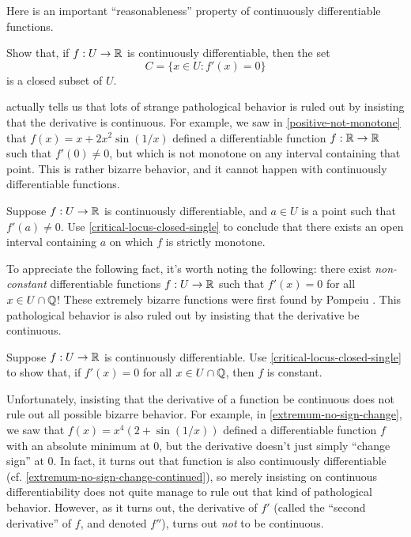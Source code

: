 Here is an important ``reasonableness'' property of continuously differentiable functions. 

\begin{exercise} \label{critical-locus-closed-single}
	Show that, if $f : U \to \mathbb{R}$ is continuously differentiable, then the set
	\[ C = \{ x \in U : f'(x) = 0 \} \]
	is a closed subset of $U$. 
\end{exercise}

 actually tells us that lots of strange pathological behavior is ruled out by insisting that the derivative is continuous. For example, we saw in \cref{positive-not-monotone} that $f(x) = x + 2x^2\sin(1/x)$ defined a differentiable function $f : \mathbb{R} \to \mathbb{R}$ such that $f'(0) \neq 0$, but which is not monotone on any interval containing that point. This is rather bizarre behavior, and it cannot happen with continuously differentiable functions. 

\begin{exercise} \label{nonzero-derivative-at-point-implies-monotone-in-neighborhood}
	Suppose $f : U \to \mathbb{R}$ is continuously differentiable, and $a \in U$ is a point such that $f'(a) \neq 0$. Use \cref{critical-locus-closed-single} to conclude that there exists an open interval containing $a$ on which $f$ is strictly monotone. 
\end{exercise}

To appreciate the following fact, it's worth noting the following: there exist \emph{non-constant} differentiable functions $f : U \to \mathbb{R}$ such that $f'(x) = 0$ for all $x \in U \cap \mathbb{Q}$! These extremely bizarre functions were first found by Pompeiu \cite{pompeiu}. This pathological behavior is also ruled out by insisting that the derivative be continuous. 

\begin{exercise} \label{critical-dense-implies-constant}
	Suppose $f : U \to \mathbb{R}$ is continuously differentiable. Use \cref{critical-locus-closed-single} to show that, if $f'(x) = 0$ for all $x \in U \cap \mathbb{Q}$, then $f$ is constant. 
\end{exercise}

Unfortunately, insisting that the derivative of a function be continuous does not rule out all possible bizarre behavior. For example, in \cref{extremum-no-sign-change}, we saw that $f(x) = x^4 \left( 2 + \sin(1/x) \right)$ defined a differentiable function $f$ with an absolute minimum at 0, but the derivative doesn't just simply ``change sign'' at 0. In fact, it turns out that function is also continuously differentiable (cf. \cref{extremum-no-sign-change-continued}), so merely insisting on continuous differentiability does not quite manage to rule out that kind of pathological behavior. However, as it turns out, the derivative of $f'$ (called the ``second derivative'' of $f$, and denoted $f''$), turns out \emph{not} to be continuous. 

